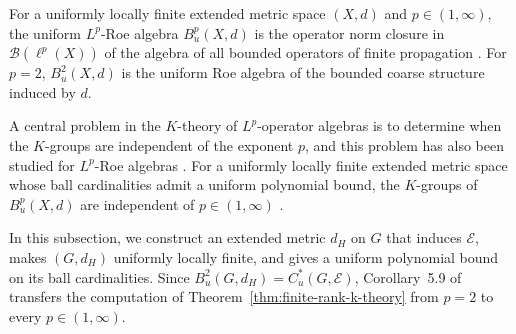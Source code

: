 \documentclass[pdflatex,sn-mathphys-num]{sn-jnl}%
\theoremstyle{plain}
\theoremstyle{remark}
\theoremstyle{definition}
\numberwithin{equation}{section}
\begin{document}

For a uniformly locally finite extended metric space \( (X,d) \) and \( p\in(1,\infty) \), the uniform \( L^p \)-Roe algebra \( B_u^p(X,d) \) is the operator norm closure in \( \mathcal B(\ell^p(X)) \) of the algebra of all bounded operators of finite propagation \cite[p.~634]{austad2025polynomial}. For \( p=2 \), \( B_u^2(X,d) \) is the uniform Roe algebra of the bounded coarse structure induced by \( d \).

A central problem in the \( K \)-theory of \( L^p \)-operator algebras is to determine when the \( K \)-groups are independent of the exponent \( p \), and this problem has also been studied for \( L^p \)-Roe algebras \cite[Question~3.1]{austad2025polynomial}. For a uniformly locally finite extended metric space whose ball cardinalities admit a uniform polynomial bound, the \( K \)-groups of \( B_u^p(X,d) \) are independent of \( p\in(1,\infty) \) \cite[Corollary~5.9]{austad2025polynomial}.

In this subsection, we construct an extended metric \( d_H \) on \( G \) that induces \( \mathcal E \), makes \( (G,d_H) \) uniformly locally finite, and gives a uniform polynomial bound on its ball cardinalities. Since \( B_u^2(G,d_H)=C_u^*(G,\mathcal E) \), Corollary~5.9 of \cite{austad2025polynomial} transfers the computation of Theorem~\ref{thm:finite-rank-k-theory} from \( p=2 \) to every \( p\in(1,\infty) \).
\end{document}
